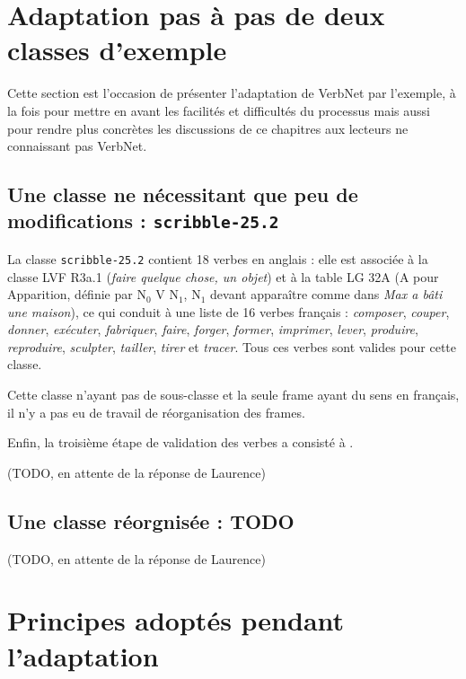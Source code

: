 \section{Adaptation pas à pas de deux classes d'exemple}
\label{exempleadaptation}

Cette section est l'occasion de présenter l'adaptation de VerbNet par
l'exemple, à la fois pour mettre en avant les facilités et difficultés du
processus mais aussi pour rendre plus concrètes les discussions de ce chapitres
aux lecteurs ne connaissant pas VerbNet.

\subsection{Une classe ne nécessitant que peu de modifications :
\texttt{scribble-25.2}}
\label{exemple_scribble}

La classe {\color{blue}\texttt{scribble-25.2}} contient 18 verbes en anglais :
elle est associée à la classe LVF {\color{red}R3a.1} (\textit{faire quelque
chose, un objet}) et à la table LG {\color{green}32A} (A pour Apparition,
définie par N$_0$ V N$_1$, N$_1$ devant apparaître comme dans \textit{Max a
bâti une maison}), ce qui conduit à une liste de 16 verbes français :
\textit{composer}, \textit{couper}, \textit{donner}, \textit{exécuter},
\textit{fabriquer}, \textit{faire}, \textit{forger}, \textit{former},
\textit{imprimer}, \textit{lever}, \textit{produire}, \textit{reproduire},
\textit{sculpter}, \textit{tailler}, \textit{tirer} et \textit{tracer}. Tous
ces verbes sont valides pour cette classe.

Cette classe n'ayant pas de sous-classe et la seule frame ayant du sens en
français, il n'y a pas eu de travail de réorganisation des frames.

Enfin, la troisième étape de validation des verbes a consisté à .

(TODO, en attente de la réponse de Laurence)

\subsection{Une classe réorgnisée : TODO}

(TODO, en attente de la réponse de Laurence)

\section{Principes adoptés pendant l'adaptation}

